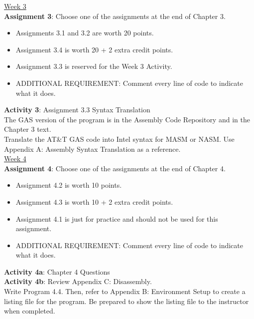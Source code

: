 \documentclass[11pt]{article}
\begin{document}
\underline {Week 3} \\
\textbf {Assignment 3}: Choose one of the assignments at the end of Chapter 3.
\begin{itemize} \itemsep -1.5em
	\item Assignments 3.1 and 3.2 are worth 20 points. \\
	\item Assignment 3.4 is worth 20 + 2 extra credit points. \\
	\item Assignment 3.3 is reserved for the Week 3 Activity. \\
	\item ADDITIONAL REQUIREMENT: Comment every line of code to indicate what it does.
\end{itemize}

\textbf {Activity 3}: Assignment 3.3 Syntax Translation \\
The GAS version of the program is in the Assembly Code Repository and in the Chapter 3 text. \\
Translate the AT\&T GAS code into Intel syntax for MASM or NASM.  Use Appendix A: Assembly Syntax Translation as a reference. \\

\underline {Week 4} \\
\textbf {Assignment 4}: Choose one of the assignments at the end of Chapter 4.
\begin{itemize} \itemsep -1.5em
	\item Assignment 4.2 is worth 10 points. \\
	\item Assignment 4.3 is worth 10 + 2 extra credit points. \\
	\item Assignment 4.1 is just for practice and should not be used for this assignment. \\
	\item ADDITIONAL REQUIREMENT: Comment every line of code to indicate what it does.
\end{itemize}

\textbf {Activity 4a}: Chapter 4 Questions \\
\textbf {Activity 4b}: Review Appendix C: Disassembly. \\
Write Program 4.4. Then, refer to Appendix B: Environment Setup to create a listing file for the program.
Be prepared to show the listing file to the instructor when completed. \\
\end{document}
